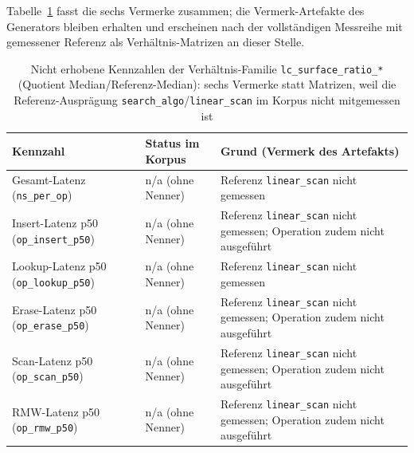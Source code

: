 \ifPlatzhalterAlsTabelle%
Tabelle~\ref{tab:t3:ratio} fasst die sechs Vermerke zusammen; die Vermerk-Artefakte des Generators
bleiben erhalten und erscheinen nach der vollständigen Messreihe mit gemessener Referenz als
Verhältnis-Matrizen an dieser Stelle.
\begin{table}[!htbp]
\centering
\small
\begin{tabular}{@{}>{\raggedright\arraybackslash}p{4.4cm}>{\raggedright\arraybackslash}p{3.0cm}>{\raggedright\arraybackslash}p{7.0cm}@{}}
\toprule
Kennzahl & Status im Korpus & Grund (Vermerk des Artefakts) \\
\midrule
Gesamt-Latenz (\texttt{ns\_per\_op}) & n/a (ohne Nenner) & Referenz \texttt{linear\_scan} nicht gemessen \\
Insert-Latenz p50 (\texttt{op\_insert\_p50}) & n/a (ohne Nenner) & Referenz \texttt{linear\_scan} nicht gemessen; Operation zudem nicht ausgeführt \\
Lookup-Latenz p50 (\texttt{op\_lookup\_p50}) & n/a (ohne Nenner) & Referenz \texttt{linear\_scan} nicht gemessen \\
Erase-Latenz p50 (\texttt{op\_erase\_p50}) & n/a (ohne Nenner) & Referenz \texttt{linear\_scan} nicht gemessen; Operation zudem nicht ausgeführt \\
Scan-Latenz p50 (\texttt{op\_scan\_p50}) & n/a (ohne Nenner) & Referenz \texttt{linear\_scan} nicht gemessen; Operation zudem nicht ausgeführt \\
RMW-Latenz p50 (\texttt{op\_rmw\_p50}) & n/a (ohne Nenner) & Referenz \texttt{linear\_scan} nicht gemessen; Operation zudem nicht ausgeführt \\
\bottomrule
\end{tabular}
\caption{Nicht erhobene Kennzahlen der Verhältnis-Familie \texttt{lc\_surface\_ratio\_*} (Quotient
Median/Referenz-Median): sechs Vermerke statt Matrizen, weil die Referenz-Ausprägung
\texttt{search\_algo}/\texttt{linear\_scan} im Korpus nicht mitgemessen ist}%
\label{tab:t3:ratio}
\end{table}
\else
{}
